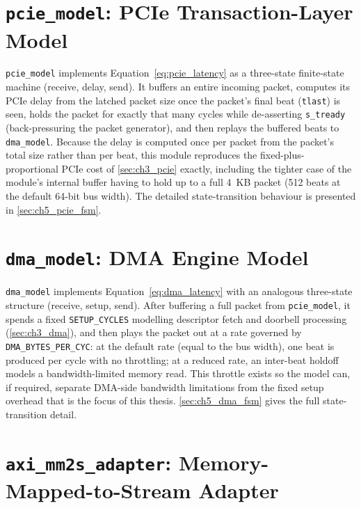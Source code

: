 
\section{\texttt{pcie\_model}: PCIe Transaction-Layer Model}
\label{sec:ch4_pcie_model}

\texttt{pcie\_model} implements Equation~\ref{eq:pcie_latency} as a three-state finite-state machine (receive, delay, send). It buffers an entire incoming packet, computes its PCIe delay from the latched packet size once the packet's final beat (\texttt{tlast}) is seen, holds the packet for exactly that many cycles while de-asserting \texttt{s\_tready} (back-pressuring the packet generator), and then replays the buffered beats to \texttt{dma\_model}. Because the delay is computed once per packet from the packet's total size rather than per beat, this module reproduces the fixed-plus-proportional PCIe cost of \autoref{sec:ch3_pcie} exactly, including the tighter case of the module's internal buffer having to hold up to a full 4~KB packet (512 beats at the default 64-bit bus width). The detailed state-transition behaviour is presented in \autoref{sec:ch5_pcie_fsm}.

\section{\texttt{dma\_model}: DMA Engine Model}
\label{sec:ch4_dma_model}

\texttt{dma\_model} implements Equation~\ref{eq:dma_latency} with an analogous three-state structure (receive, setup, send). After buffering a full packet from \texttt{pcie\_model}, it spends a fixed \texttt{SETUP\_CYCLES} modelling descriptor fetch and doorbell processing (\autoref{sec:ch3_dma}), and then plays the packet out at a rate governed by \texttt{DMA\_BYTES\_PER\_CYC}: at the default rate (equal to the bus width), one beat is produced per cycle with no throttling; at a reduced rate, an inter-beat holdoff models a bandwidth-limited memory read. This throttle exists so the model can, if required, separate DMA-side bandwidth limitations from the fixed setup overhead that is the focus of this thesis. \autoref{sec:ch5_dma_fsm} gives the full state-transition detail.

\section{\texttt{axi\_mm2s\_adapter}: Memory-Mapped-to-Stream Adapter}
\label{sec:ch4_mm2s}


